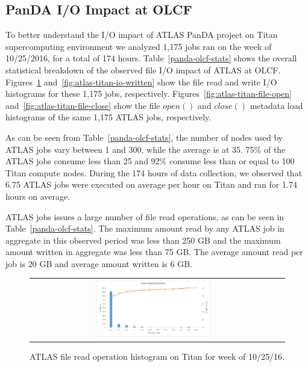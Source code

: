 \subsection{PanDA I/O Impact at OLCF}

To better understand the I/O impact of ATLAS PanDA project on Titan
supercomputing environment we analyzed 1,175 jobs ran on the week of 10/25/2016,
for a total of 174 hours. Table~\ref{panda-olcf-stats} shows the overall
statistical breakdown of the observed file I/O impact of ATLAS at OLCF\@.
Figures~\ref{fig:atlas-titan-io-read} and~\ref{fig:atlas-titan-io-written} show
the file read and write I/O histograms for these 1,175 jobs, respectively.
Figures~\ref{fig:atlas-titan-file-open} and~\ref{fig:atlas-titan-file-close}
show the file $open()$ and $close()$ metadata load histograms of the same 1,175
ATLAS jobs, respectively.

As can be seen from Table~\ref{panda-olcf-stats}, the number of nodes used by
ATLAS jobs vary between 1 and 300, while the average is at 35. 75\% of the ATLAS
jobs consume less than 25 and 92\% consume less than or equal to 100 Titan
compute nodes. During the 174 hours of data collection, we observed that 6.75
ATLAS jobs were executed on average per hour on Titan and ran for 1.74 hours on
average.

ATLAS jobs issues a large number of file read operations, as can be seen in
Table~\ref{panda-olcf-stats}. The maximum amount read by any ATLAS job in
aggregate in this observed period was less than 250 GB and the maximum amount
written in aggregate was less than 75 GB\@. The average amount read per job is
20 GB and average amount written is 6 GB\@.

\begin{figure}[!htb]
    \centering
    \begin{tabular}{cc}
        {\includegraphics[width=0.48\textwidth]{figures/panda_data_read_finer_hist.pdf}}\\
    \end{tabular}
    \caption{ATLAS file read operation histogram on Titan for week of 10/25/16.}
\label{fig:atlas-titan-io-read}
\end{figure}

